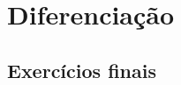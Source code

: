 
\chapter{Diferenciação}\label{cap:diferenciacao}

\emconstrucao

\section{Exercícios finais}

\construirExer